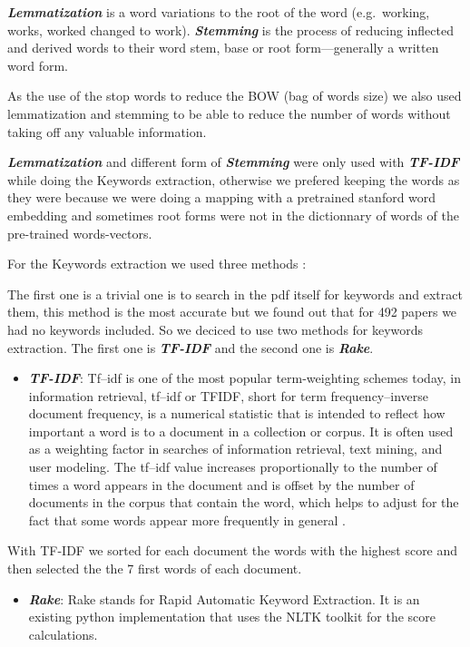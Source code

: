 \documentclass[article,twocolumn]{IEEEtran}
\providecommand{\tightlist}{%
      \setlength{\itemsep}{0pt}\setlength{\parskip}{0pt}}
\begin{document}
\textbf{\emph{Lemmatization}} is a word variations to the root of the
word (e.g.~working, works, worked changed to work).
\textbf{\emph{Stemming}} is the process of reducing inflected and
derived words to their word stem, base or root form---generally a
written word form.

As the use of the stop words to reduce the BOW (bag of words size) we
also used lemmatization and stemming to be able to reduce the number of
words without taking off any valuable information.

    \textbf{\emph{Lemmatization}} and different form of
\textbf{\emph{Stemming}} were only used with \textbf{\emph{TF-IDF}}
while doing the Keywords extraction, otherwise we prefered keeping the
words as they were because we were doing a mapping with a pretrained
stanford word embedding and sometimes root forms were not in the
dictionnary of words of the pre-trained words-vectors.

    For the Keywords extraction we used three methods :

The first one is a trivial one is to search in the pdf itself for
keywords and extract them, this method is the most accurate but we found
out that for 492 papers we had no keywords included. So we deciced to
use two methods for keywords extraction. The first one is
\textbf{\emph{TF-IDF}} and the second one is \textbf{\emph{Rake}}.

    \begin{itemize}
\tightlist
\item
  \textbf{\emph{TF-IDF}}: Tf--idf is one of the most popular
  term-weighting schemes today, in information retrieval, tf--idf or
  TFIDF, short for term frequency--inverse document frequency, is a
  numerical statistic that is intended to reflect how important a word
  is to a document in a collection or corpus. It is often used as a
  weighting factor in searches of information retrieval, text mining,
  and user modeling. The tf--idf value increases proportionally to the
  number of times a word appears in the document and is offset by the
  number of documents in the corpus that contain the word, which helps
  to adjust for the fact that some words appear more frequently in
  general \cite{Tf-idf}.
\end{itemize}

    With TF-IDF we sorted for each document the words with the highest score
and then selected the the 7 first words of each document.

    \begin{itemize}
\tightlist
\item
  \textbf{\emph{Rake}}: Rake stands for Rapid Automatic Keyword
  Extraction. It is an existing python implementation that uses the NLTK
  toolkit for the score calculations.
\end{itemize}
\end{document}
